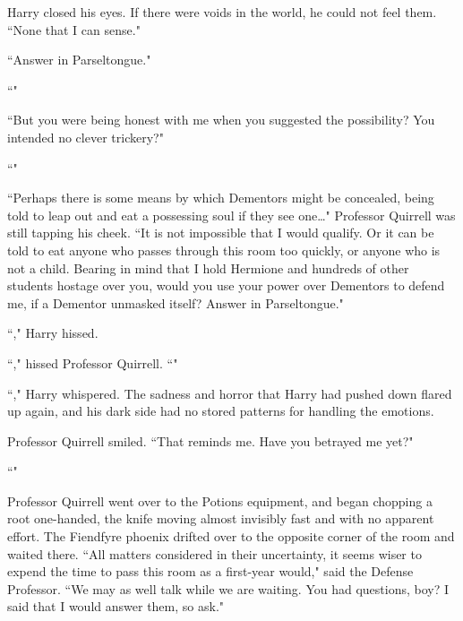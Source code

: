 Harry closed his eyes. If there were voids in the world, he could not feel them. ``None that I can sense."

``Answer in Parseltongue."

``"

``But you were being honest with me when you suggested the possibility? You intended no clever trickery?"

``"

``Perhaps there is some means by which Dementors might be concealed, being told to leap out and eat a possessing soul if they see one{\ldots}" Professor Quirrell was still tapping his cheek. ``It is not impossible that I would qualify. Or it can be told to eat anyone who passes through this room too quickly, or anyone who is not a child. Bearing in mind that I hold Hermione and hundreds of other students hostage over you, would you use your power over Dementors to defend me, if a Dementor unmasked itself? Answer in Parseltongue."

``," Harry hissed.

``," hissed Professor Quirrell. ``"

``," Harry whispered. The sadness and horror that Harry had pushed down flared up again, and his dark side had no stored patterns for handling the emotions. 

Professor Quirrell smiled. ``That reminds me. Have you betrayed me yet?"

``"

Professor Quirrell went over to the Potions equipment, and began chopping a root one-handed, the knife moving almost invisibly fast and with no apparent effort. The Fiendfyre phoenix drifted over to the opposite corner of the room and waited there. ``All matters considered in their uncertainty, it seems wiser to expend the time to pass this room as a first-year would," said the Defense Professor. ``We may as well talk while we are waiting. You had questions, boy? I said that I would answer them, so ask."

